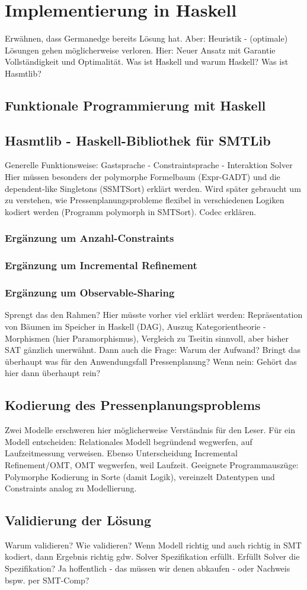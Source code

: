 \chapter{Implementierung in Haskell}
Erwähnen, dass Germanedge bereits Lösung hat.
Aber: Heuristik - (optimale) Lösungen gehen möglicherweise verloren.
Hier: Neuer Ansatz mit Garantie Vollständigkeit und Optimalität.
Was ist Haskell und warum Haskell?
Was ist Hasmtlib?

\section{Funktionale Programmierung mit Haskell}

\section{Hasmtlib - Haskell-Bibliothek für SMTLib}
Generelle Funktionsweise: Gastsprache - Constraintsprache - Interaktion Solver
Hier müssen besonders der polymorphe Formelbaum (Expr-GADT) und die dependent-like Singletons (SSMTSort) erklärt werden.
Wird später gebraucht um zu verstehen, wie Pressenplanungsprobleme flexibel in verschiedenen Logiken kodiert werden (Programm polymorph in SMTSort).
Codec erklären.

\subsection{Ergänzung um Anzahl-Constraints}

\subsection{Ergänzung um Incremental Refinement}

\subsection{Ergänzung um Observable-Sharing}
Sprengt das den Rahmen?
Hier müsste vorher viel erklärt werden:
Repräsentation von Bäumen im Speicher in Haskell (DAG),
Auszug Kategorientheorie - Morphismen (hier Paramorphismus),
Vergleich zu Tseitin sinnvoll, aber bisher SAT gänzlich unerwähnt.
Dann auch die Frage: Warum der Aufwand?
Bringt das überhaupt was für den Anwendungsfall Pressenplanung?
Wenn nein: Gehört das hier dann überhaupt rein?

\section{Kodierung des Pressenplanungsproblems}
Zwei Modelle erschweren hier möglicherweise Verständnis für den Leser.
Für ein Modell entscheiden: Relationales Modell begründend wegwerfen, auf Laufzeitmessung verweisen.
Ebenso Unterscheidung Incremental Refinement/OMT, OMT wegwerfen, weil Laufzeit.
Geeignete Programmauszüge: Polymorphe Kodierung in Sorte (damit Logik), vereinzelt Datentypen und Constraints analog zu Modellierung.

\section{Validierung der Lösung}
Warum validieren?
Wie validieren?
Wenn Modell richtig und auch richtig in SMT kodiert, dann Ergebnis richtig gdw. Solver Spezifikation erfüllt.
Erfüllt Solver die Spezifikation? Ja hoffentlich - das müssen wir denen abkaufen - oder Nachweis bspw. per SMT-Comp?